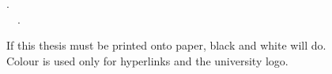 \vspace*{\fill}

\begin{loosecontent}

\thetitle. \\
\textcopyright~\theyear~\theauthor.


If this thesis must be printed onto paper, black and white will do. \\
Colour is used only for hyperlinks and the university logo.

\end{loosecontent}

\vspace{5em}
